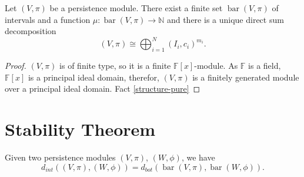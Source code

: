 \begin{theorem}[Structure]
    Let $ (V, \pi) $ be a persistence module. There exist a finite set $ \operatorname{bar}(V, \pi) $ of intervals and a function $ \mu : \operatorname{bar}(V, \pi) \longrightarrow \mathbb N $ and there is a unique direct sum decomposition
    $$
        (V, \pi) \cong \bigoplus_{i=1}^N (I_i, c_i)^{m_i}.
    $$
\end{theorem}
\begin{proof}
    $ (V, \pi) $ is of finite type, so it is a finite $ \mathbb F[x] $-module. As $ \mathbb F $ is a field, $ \mathbb F[x] $ is a principal ideal domain, therefor, $ (V, \pi) $ is a finitely generated module over a principal ideal domain. Fact \ref{structure-pure} 
\end{proof}

\section{Stability Theorem}
\begin{lemma}
    
\end{lemma}

\begin{theorem}[Stability]
    Given two persistence modules $ (V, \pi) $, $ (W, \phi) $, we have
    $$
        d_{int} ((V, \pi), (W, \phi)) = d_{bot} (\operatorname{bar}(V, \pi), \operatorname{bar}(W, \phi)).
    $$
\end{theorem}
